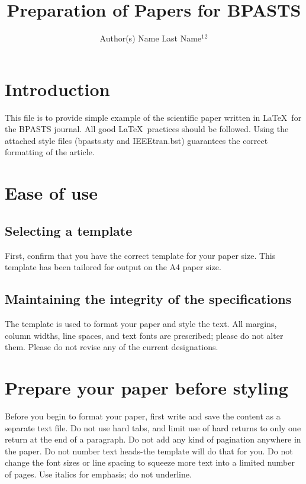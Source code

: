 \documentclass[10pt,twoside,twocolumn,a4paper]{article}
\title{Preparation of Papers for BPASTS}
\author{Author(s) Name Last Name$^{1}$$^{2}$\email{smith@university.edu.pl}}
\begin{document}
\maketitle


\section{Introduction}

This file is to provide simple example of the scientific paper written in \LaTeX~for the BPASTS journal. 
All good \LaTeX~practices should be followed. Using the attached style files (bpasts.sty and IEEEtran.bst) guarantees the correct formatting of the article.  

\section{Ease of use}

\subsection{Selecting a template}
First, confirm that you have the correct template for your paper size. This template has been tailored for output on the A4 paper size.

\subsection{Maintaining the integrity of the specifications}
The template is used to format your paper and style the text. All margins, column widths, line spaces, and text fonts are prescribed; please do not alter them. Please do not revise any of the current designations.



\section{Prepare your paper before styling}

Before you begin to format your paper, first write and save the content as a separate text file. Do not use hard tabs, and limit use of hard returns to only one return at the end of a paragraph. Do not add any kind of pagination anywhere in the paper. Do not number text heads-the template will do that for you. Do not change the font sizes or line spacing to squeeze more text into a limited number of pages. Use italics for emphasis; do not underline.
\end{document}

